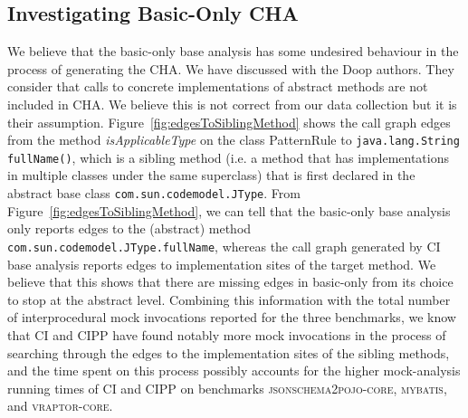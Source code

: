\subsection{Investigating Basic-Only CHA}
\label{subsec:basic-only-cha}

We believe that the basic-only base analysis has some undesired behaviour in the process of generating the CHA. We have discussed with the Doop authors. They consider that calls to concrete implementations of abstract methods are not included in CHA. We believe this is not correct from our data collection but it is their assumption. Figure~\ref{fig:edgesToSiblingMethod} shows the call graph edges from the method \textit{isApplicableType} on the class PatternRule to \texttt{java.lang.String fullName()}, which is a sibling method (i.e. a method that has implementations in multiple classes under the same superclass) that is first declared in the abstract base class \texttt{com.sun.codemodel.JType}. From Figure~\ref{fig:edgesToSiblingMethod}, we can tell that the basic-only base analysis only reports edges to the (abstract) method \texttt{com.sun.codemodel.JType.fullName}, whereas the call graph generated by CI base analysis reports edges to implementation sites of the target method. We believe that this shows that there are missing edges in basic-only from its choice to stop at the abstract level. Combining this information with the total number of interprocedural mock invocations reported for the three benchmarks, we know that CI and CIPP have found notably more mock invocations in the process of searching through the edges to the implementation sites of the sibling methods, and the time spent on this process possibly accounts for the higher mock-analysis running times of CI and CIPP on benchmarks \textsc{jsonschema2pojo-core}, \textsc{mybatis}, and \textsc{vraptor-core}.


